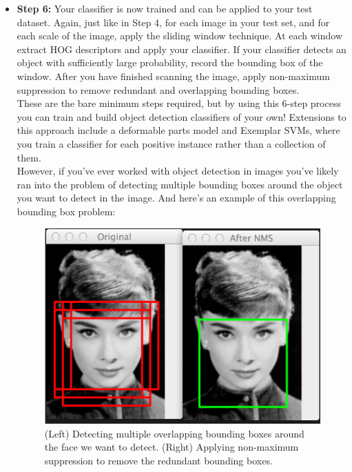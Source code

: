 \begin{itemize}
            \item \textbf{Step 6:} Your classifier is now trained and can be applied to your test dataset. Again, just like in Step 4, for each image in your test set, and for each scale of the image, apply the sliding window technique. 
                At each window extract HOG descriptors and apply your classifier. If your classifier detects an object with sufficiently large probability, record the bounding box of the window. After you have finished scanning the image, 
                apply non-maximum suppression to remove redundant and overlapping bounding boxes. \\ 
                \vspace{2mm}
                These are the bare minimum steps required, but by using this 6-step process you can train and build object detection classifiers of your own! Extensions to this approach include a deformable parts model and Exemplar SVMs, 
                where you train a classifier for each positive instance rather than a collection of them. \\ 
                \vspace{2mm}
                However, if you’ve ever worked with object detection in images you’ve likely ran into the problem of detecting multiple bounding boxes around the object you want to detect in the image. And here’s an example of this overlapping bounding box problem:
                \begin{figure}[H]
                    \centering
                    \includegraphics[width=0.6\linewidth]{img/multiple-overlapping.jpg}
                    \caption{(Left) Detecting multiple overlapping bounding boxes around the face we want to detect. (Right) Applying non-maximum suppression to remove the redundant bounding boxes.}
                \end{figure}
        \end{itemize}
